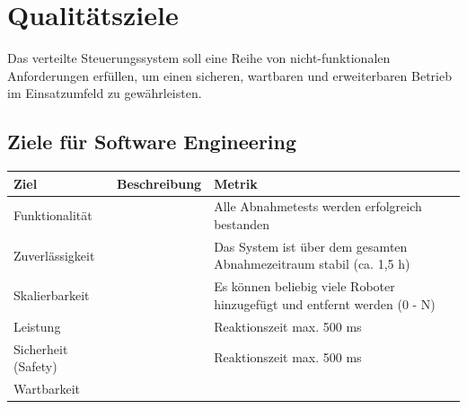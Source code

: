 \section{Qualitätsziele}

Das verteilte Steuerungssystem soll eine Reihe von nicht-funktionalen Anforderungen erfüllen, um einen sicheren, wartbaren und erweiterbaren Betrieb im Einsatzumfeld zu gewährleisten. 

\subsection{Ziele für Software Engineering}
\begin{table}[h!]
    \centering
    \begin{tabular}{p{4cm}|p{5cm}|p{5cm}|}
        \hline
        \textbf{Ziel} & \textbf{Beschreibung} & \textbf{Metrik} \\
        \hline
        Funktionalität &  
        & Alle Abnahmetests werden erfolgreich bestanden
        \\
        \hline
        Zuverlässigkeit & 
        & Das System ist über dem gesamten Abnahmezeitraum stabil (ca. 1,5 h)
        \\
        \hline
        Skalierbarkeit & 
        & Es können beliebig viele Roboter hinzugefügt und entfernt werden (0 - N)
        \\
        \hline
        Leistung & 
        & Reaktionszeit max. 500 ms
        \\
        \hline
        Sicherheit (Safety) & 
        & Reaktionszeit max. 500 ms
        \\
        \hline
        Wartbarkeit & 

\end{tabular}
\end{table}
